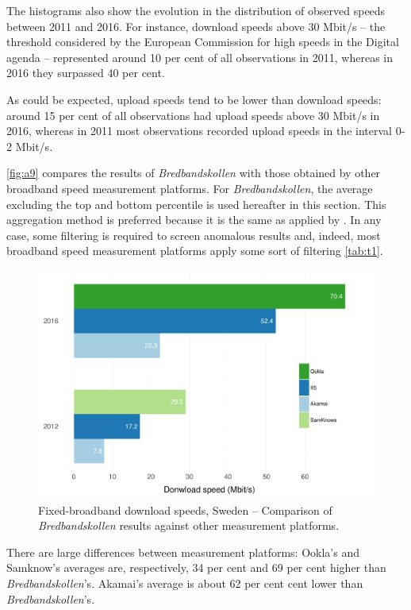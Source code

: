 \documentclass[12pt]{article}
\begin{document}
The histograms also show the evolution in the distribution of observed speeds between 2011 and 2016. For instance, download speeds above 30 Mbit/s -- the threshold considered by the European Commission for high speeds in the Digital agenda \citep{digitalagenda} -- represented around 10 per cent of all observations in 2011, whereas in 2016 they surpassed 40 per cent.

As could be expected, upload speeds tend to be lower than download speeds: around 15 per cent of all observations had upload speeds above 30 Mbit/s in 2016, whereas in 2011 most observations recorded upload speeds in the interval 0-2 Mbit/s.   

\autoref{fig:a9} compares the results of \textit{Bredbandskollen} with those obtained by other broadband speed measurement platforms. For \textit{Bredbandskollen}, the average excluding the top and bottom percentile is used hereafter in this section. This aggregation method is preferred because it is the same as applied by  \citep{samknows2013}. In any case, some filtering is required to screen anomalous results and, indeed, most broadband speed measurement platforms apply some sort of filtering \autoref{tab:t1}.       

\vspace{0.5cm} 
\begin{figure}[H]
    \centering
        \includegraphics[width=0.9\linewidth]{comparison_speeds.pdf}
        \caption{Fixed-broadband download speeds, Sweden -- Comparison of \textit{Bredbandskollen} results against other measurement platforms.}
        \label{fig:a9}
\end{figure}   

There are large differences between measurement platforms: Ookla's and Samknow's averages are, respectively, 34 per cent and 69 per cent higher than \textit{Bredbandskollen}'s. Akamai's average is about 62 per cent cent lower than \textit{Bredbandskollen}'s. 
\end{document}
